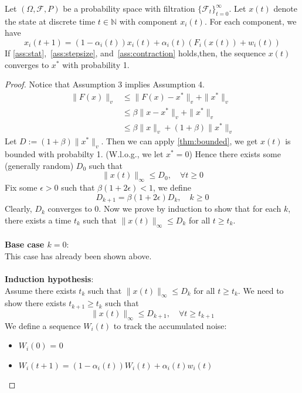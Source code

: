 \begin{theorem}\label{thm: contraction}
Let $(\Omega, \mathcal{F},P)$ be a probability space with filtration $\{\mathcal{F}_t\}_{t=0}^\infty$. Let $x(t)$ denote the state at discrete time $t\in\mathbb{N}$ with component $x_i(t)$. For each component, we have
$$
x_i(t+1) = (1-\alpha_i(t))x_i(t) + \alpha_i(t)(F_i(x(t)) + w_i(t)) 
$$
If \autoref{ass:stat},~\ref{ass:stepsize}, and~\ref{ass:contraction} holds,then, the sequence $x(t)$ converges to $x^*$ with probability 1.
\end{theorem}
\begin{proof}
   Notice that Assumption 3 implies Assumption 4.
        \begin{align*}
        \|F(x)\|_v &\le \|F(x)-x^*\|_v + \|x^*\|_v\tag{$\Delta$ ineq.}\\
        &\le \beta \|x-x^*\|_v+\|x^*\|_v\tag{Assumption 3}\\
        &\le \beta\|x\|_v + (1+\beta) \|x^*\|_v\tag{$\Delta$ ineq.}
    \end{align*}
    Let $D:= (1+\beta)\|x^*\|_v$. Then we can apply \autoref{thm:bounded}, we get $x(t)$ is bounded with probabilty 1. (W.l.o.g., we let $x^*=0$) Hence there exists some (generally random) $D_0$ such that 
    $$
    \|x(t)\|_\infty \le D_0,\quad \forall t\ge 0
    $$
    Fix some $\epsilon>0$ such that $\beta(1+2\epsilon)<1$, we define
    \begin{equation}\label{eq:Dkrecursive}
        D_{k+1} = \beta(1+2\epsilon)D_k,\quad k\ge 0
    \end{equation}
    Clearly, $D_k$ converges to $0$. Now we prove by induction to show that for each $k$, there exists a time $t_k$ such that $\|x(t)\|_\infty\le D_k$ for all $t\ge t_k$.\\
    \\
    \textbf{Base case $k=0$}:\\
    This case has already been shown above.\\
    \\
    \textbf{Induction hypothesis}:\\
    Assume there exists $t_k$ such that $\|x(t)\|_\infty \le D_k$ for all $t\ge t_k$. We need to show there exists $t_{k+1}\ge t_k$ such that 
    $$
    \|x(t)\|_\infty \le D_{k+1},\quad \forall t\ge t_{k+1}
    $$
    We define a sequence $W_i(t)$ to track the accumulated noise:
    \begin{itemize}
        \item $W_i(0)$ = 0\\
        \item $W_i(t+1) = (1-\alpha_i(t))W_i(t) + \alpha_i(t)w_i(t)$

\end{itemize}
\end{proof}
